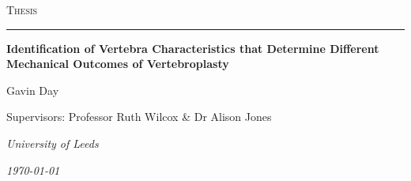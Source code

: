\begin{titlepage}

\center


\textsc{\Large Thesis}\\[0.5cm]
\hrule
\vspace{3cm}

{\LARGE \textbf{Identification of Vertebra Characteristics that Determine Different Mechanical Outcomes of Vertebroplasty}\par}  %

 \vspace{5cm}

Gavin Day

\vspace{0.5cm}

Supervisors: Professor Ruth Wilcox \& Dr Alison Jones


\vspace{7cm}

\textit{University of Leeds}

\textit{\today}
\vfill

\end{titlepage}


\pagebreak
